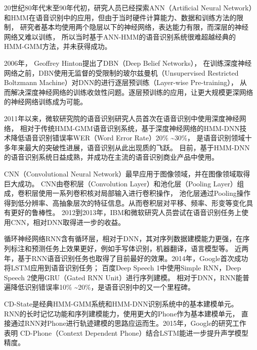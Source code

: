 20世纪80年代末至90年代初，研究人员已经探索ANN（Artificial Neural Network）和HMM在语音识别中的应用，但由于当时硬件计算能力、数据和训练方法的限制，
研究者基本均使用两个隐层以下的神经网络，表达能力有限，而深层的神经网络又难以训练，
所以当时基于ANN-HMM的语音识别系统很难超越经典的HMM-GMM方法，并未获得成功。

2006年， Geoffrey Hinton提出了DBN（Deep Belief Networks），
在训练深度神经网络之前，DBN使用无监督的受限制的玻尔兹曼机（Unsupervised Restricted Boltzmann Machine）对DNN的进行逐层预训练（Layer-wise Pre-training），
从而解决深度神经网络的训练收敛性问题。逐层预训练的应用，让更大规模更深网络的神经网络训练成为可能。

2011年以来，微软研究院的语音识别研究人员首次在语音识别中使用深度神经网络，
相对于传统HMM-GMM语音识别系统，基于深度神经网络的HMM-DNN技术降低语音识别错误率WER（Word Error Rate）20\% \textasciitilde 30\%，
是语音识别领域十多年来最大的突破性进展，语音识别从此出现质的飞跃。
目前，基于HMM-DNN的语音识别系统日益成熟，并成功在主流的语音识别商业产品中使用。


CNN（Convolutional Neural Network）最早应用于图像领域，并在图像领域取得巨大成功。
CNN由卷积层（Convolution Layer）和池化层（Pooling Layer）组成，卷积层使用一系列卷积核对局部输入进行卷积操作，
池化层通过Pooling操作得到低分辨率、高抽象层次的特征信息。从而卷积层对平移、频率、形变等变化具有更好的鲁棒性。
2012到2013年，IBM和微软研究人员尝试在语音识别任务上使用CNN，相对DNN取得进一步的收益。

循环神经网络RNN含有循环层，相对于DNN，其对序列数据建模能力更强，在序列标注和预测任务上效果更好，例如手写体识别，机器翻译，语言模型等。
近两年，基于RNN语音识别任务也取得了目前最好的效果。2014年，Google首次成功将LSTM应用到语音识别任务；
百度Deep Speech 1中使用Simple RNN，Deep Speech 2使用GRU（Gated RNN Unit）进行序列建模。
相对于DNN，RNN能普遍降低识别错误率10\% \textasciitilde 20\%，是语音识别中的又一个里程碑。

CD-State是经典HMM-GMM系统和HMM-DNN识别系统中的基本建模单元。RNN的长时记忆功能和序列建模能力，使用更大的Phone作为基本建模单元，
直接通过RNN对Phone进行轨迹建模的思路应运而生。2015年，Google的研究工作表明
CD-Phone（Context Dependent Phone）结合LSTM能进一步提升声学模型精度。

